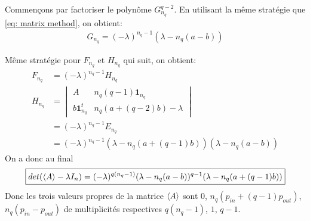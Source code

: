 Commençons par factoriser le polynôme $G_{n_q}^{q-2}$.
En utilisant la même stratégie que \eqref{eq: matrix method}, on obtient:
\begin{align*}
	G_{n_q} = (-\lambda)^{n_q - 1} (\lambda - n_q(a-b))
\end{align*}

Même stratégie pour $F_{n_q}$ et $H_{n_q}$ qui suit, on obtient: 
\begin{align*}
	F_{n_q} &= (-\lambda)^{n_q - 1} H_{n_{q}}\\
	H_{n_{q}} &= 
	\begin{vmatrix}
	A & n_{q}(q-1)\mathbf{1}_{n_q} \\
	b\mathbf{1}_{n_q}^t  &  n_q(a + (q-2)b) - \lambda
	\end{vmatrix}\\
	&= (-\lambda)^{n_q - 1}E_{n_q}\\
	&= (-\lambda)^{n_q - 1}(\lambda - n_q(a + (q-1)b))(\lambda - n_q(a-b)) 
\end{align*}
On a donc au final
\begin{equation}
	\boxed{det(\langle A \rangle - \lambda I_n) = (-\lambda)^{q(n_q -1)}(\lambda - n_q(a-b))^{q-1}(\lambda - n_q(a + (q-1)b)) }
\end{equation}
Donc les trois valeurs propres de la matrice $\langle A \rangle$ sont $0$, $n_q(p_{in} + (q-1)p_{out})$, $n_q(p_{in}-p_{out})$ de multiplicités respectives $q(n_q - 1)$, $1$, $q-1$.\\